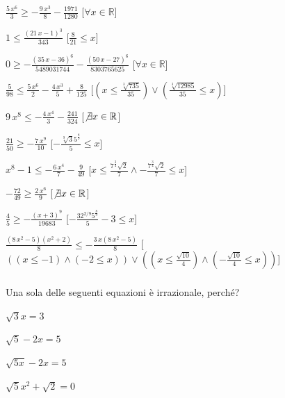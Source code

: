 \begin{esercizio}
\begin{enumeratea}
\item ${\frac {5\,{x}^{6}}{3}}\geq -{\frac {9\,{x}^{3}}{8}}-{\frac 
{1971}{1280}}$ 
\hfill [$\forall x \in \mathbb{R}$]
\item $1\leq {\frac { \left( 21\,x-1 \right) ^{3}}{343}}$ 
\hfill [${\frac {8}{21}}\leq x$]
\item $0\geq -{\frac { \left( 35\,x-36 \right) ^{6}}{5489031744}}-{\frac { 
\left( 50\,x-27 \right) ^{6}}{8303765625}}$ 
\hfill [$\forall x \in \mathbb{R}$]
\item ${\frac {5}{98}}\leq {\frac {5\,{x}^{6}}{2}}-{\frac 
{4\,{x}^{3}}{5}}+{\frac {8}{125}}$ 
\hfill [$(x\leq {\frac {\sqrt [3]{735}}{35}})\vee ({\frac {\sqrt 
[3]{12985}}{35}}\leq x)$]
\item $9\,{x}^{8}\leq -{\frac {4\,{x}^{4}}{3}}-{\frac {241}{324}}$ 
\hfill [$\not\exists x \in \mathbb{R}$]
\item ${\frac {21}{50}}\geq -{\frac {7\,{x}^{9}}{10}}$ 
\hfill [$-{\frac {\sqrt [9]{3}{5}^{{\frac {8}{9}}}}{5}}\leq x$]
\item ${x}^{8}-1\leq -{\frac {6\,{x}^{4}}{7}}-{\frac {9}{49}}$ 
\hfill [$x\leq {\frac {{7}^{{\frac {3}{4}}}\sqrt {2}}{7}} \wedge -{\frac 
{{7}^{{\frac {3}{4}}}\sqrt {2}}{7}}\leq x$]
\item $-{\frac {72}{49}}\geq {\frac {2\,{x}^{6}}{9}}$ 
\hfill [$\not\exists x \in \mathbb{R}$]
\item ${\frac {4}{5}}\geq -{\frac { \left( x+3 \right) ^{9}}{19683}}$ 
\hfill [$-{\frac {3 {2}^{2/9}{5}^{{\frac {8}{9}}}}{5}}-3\leq x$]
\item ${\frac { \left( 8\,{x}^{2}-5 \right)  \left( {x}^{2}+2 \right) }{8}}\leq 
-{\frac {3\,x \left( 8\,{x}^{2}-5 \right) }{8}}$ 
\hfill [$((x\leq -1) \wedge (-2\leq x))\vee ((x\leq {\frac {\sqrt {10}}{4}}) 
\wedge (-{\frac {\sqrt {10}}{4}}\leq x))$]
\end{enumeratea}
\end{esercizio}


\subsubsection*{}


\begin{esercizio}\label{ese:03.1}
Una sola delle seguenti equazioni è irrazionale, perché?
\begin{multicols}{4}
\begin{enumeratea}
\item \(\sqrt{3} x = 3\)
\item \(\sqrt{5} -2x = 5\)
\item \(\sqrt{5x} -2x = 5\)
\item \(\sqrt{5}x^2 +\sqrt{2} = 0\)
\end{enumeratea}
\end{multicols}
\end{esercizio}

